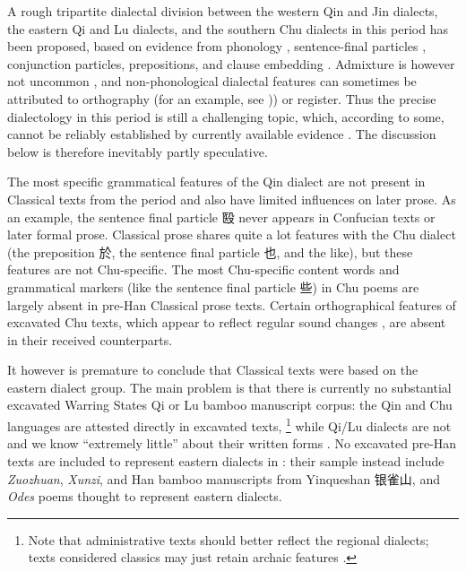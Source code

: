 \documentclass[UTF8, a4paper, oneside, scheme=plain, 12pt]{ctexrep}
\newcommand*{\citepages}[1]{pp.~{#1}}
\newcommand{\work}[1]{\textit{#1}}
\begin{document}
A rough tripartite dialectal division between the western Qin and Jin dialects, the eastern Qi and Lu dialects, and the southern Chu dialects in this period has been proposed,
based on evidence from phonology \citep{bian2017dialect,wang2000dialect}, sentence-final particles \citep{miyajima2024sfp,luo2016sfp}, conjunction particles, prepositions, and clause embedding \citep{onishi1998conj}.
Admixture is however not uncommon \citep{bian2017dialect},
and non-phonological dialectal features can sometimes be attributed to orthography (for an example, see \citealt{wu2011chucausative})) or register.
Thus the precise dialectology in this period is still a challenging topic,
which, according to some, cannot be reliably established by currently available evidence \citep{behr2023tracing}.
The discussion below is therefore inevitably partly speculative.

The most specific grammatical features of the Qin dialect are not present in Classical texts from the period and also have limited influences on later prose.
As an example, the sentence final particle 殹 never appears in Confucian texts or later formal prose.
Classical prose shares quite a lot features with the Chu dialect (the preposition 於, the sentence final particle 也, and the like),
but these features are not Chu-specific.
The most Chu-specific content words and grammatical markers (like the sentence final particle 些) in Chu poems are largely absent in pre-Han Classical prose texts.
Certain orthographical features of excavated Chu texts, which appear to reflect regular sound changes \citep{bian2017dialect}, are absent in their received counterparts. 

It however is premature to conclude that Classical texts were based on the eastern dialect group.
The main problem is that there is currently no substantial excavated Warring States Qi or Lu bamboo manuscript corpus:
the Qin and Chu languages are attested directly in excavated texts,%
\footnote{
    Note that administrative texts should better reflect the regional dialects;
    texts considered classics may just retain archaic features \citep[\citepages{45-46}]{zhang2011zhanguo}.
}
while Qi/Lu dialects are not and we know ``extremely little'' about their written forms \citep{feng2024some}.
No excavated pre-Han texts are included to represent eastern dialects in \citet{bian2017dialect}:
their sample instead include \work{Zuozhuan}, \work{Xunzi}, and Han bamboo manuscripts from Yinqueshan 银雀山, and \work{Odes} poems thought to represent eastern dialects.
\end{document}
